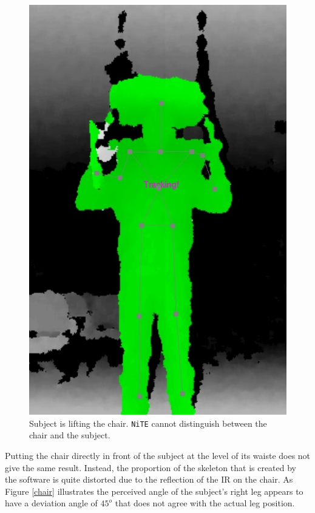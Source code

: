 \documentclass[11pt,a4paper]{article}
\begin{document}
\begin{figure}[H]
\center
\includegraphics[scale=0.2]{Head_Chair.jpg} 
\caption{Subject is lifting the chair. \texttt{NiTE} cannot distinguish between the chair and the subject.}
\label{lifting_chair}
\end{figure}

\noindent
Putting the chair directly in front of the subject at the level of its waiste does not give the same result. Instead, the proportion of the skeleton that is created by the software is quite distorted due to the reflection of the IR on the chair. As Figure \ref{chair} illustrates the perceived angle of the subject's right leg appears to have a deviation angle of $45^o$ that does not agree with the actual leg position.
\end{document}
